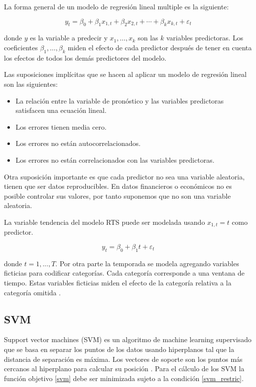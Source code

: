 La forma general de un modelo de regresión lineal multiple es la siguiente:

\[
y_{t}=\beta_{0}+\beta_{1} x_{1, t}+\beta_{2} x_{2, t}+\cdots+\beta_{k} x_{k, t}+\varepsilon_{t}
\]

donde $y$ es la variable a predecir y $x_{1}, \ldots, x_{k}$ son las $k$ variables predictoras.
Los coeficientes $\beta_{1}, \ldots, \beta_{k}$ miden el efecto de cada predictor después de tener en cuenta los efectos de todos los demás predictores del modelo.

Las suposiciones implícitas que se hacen al aplicar un modelo de regresión lineal son las siguientes:

\begin{itemize}
\item La relación entre la variable de pronóstico y las variables predictoras satisfacen una ecuación lineal.
\item Los errores tienen media cero.
\item Los errores no están autocorrelacionados.
\item Los errores no están correlacionados con las variables predictoras.
\end{itemize}

Otra suposición importante es que cada predictor no sea una variable aleatoria, tienen que ser datos reproducibles. En datos financieros o económicos no es posible controlar sus valores, por tanto suponemos que no son una variable aleatoria.

La variable tendencia del modelo RTS puede ser modelada usando $x_{1, t}=t$ como predictor.

\[
y_{t}=\beta_{0}+\beta_{1} t+\varepsilon_{t}
\]

donde $t=1,...,T$. Por otra parte la temporada se modela agregando variables ficticias para codificar categorías. Cada categoría corresponde a una ventana de tiempo. Estas variables ficticias miden el efecto de la categoría relativa a la categoría omitida \cite{hyndmanForecastingPrinciplesPractice}. 

\subsection{SVM}

Support vector machines (SVM) es un algoritmo de machine learning supervisado que se basa en separar los puntos de los datos usando hiperplanos tal que la distancia de separación es máxima. Los vectores de soporte son los puntos más cercanos al hiperplano para calcular su posición \cite{mudassirTimeseriesForecastingBitcoin2020}.
Para el cálculo de los SVM la función objetivo \ref{svm} debe ser minimizada sujeto a la condición \ref{svm_restric}.

